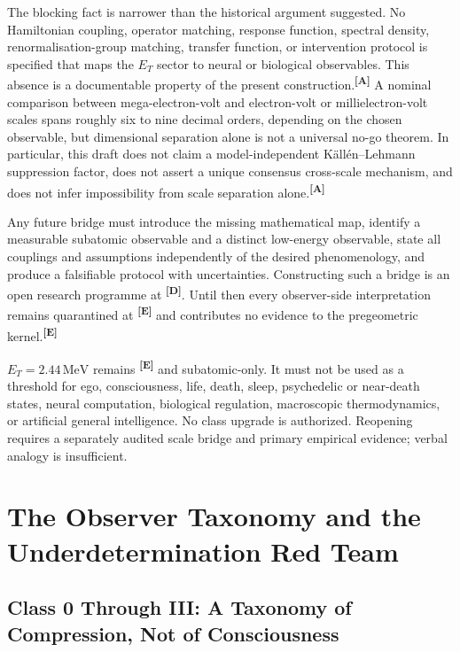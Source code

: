 \documentclass[12pt,a4paper,twoside]{article}
\theoremstyle{plain}
\theoremstyle{definition}
\theoremstyle{remark}
\newcommand{\MeV}{\,\mathrm{MeV}}
\newcommand{\catmark}[1]{\textsuperscript{\textsf{\textbf{[#1]}}}}
\newcommand{\ETorsion}{2.44\MeV} %
\begin{document}
The blocking fact is narrower than the historical argument suggested. No
Hamiltonian coupling, operator matching, response function, spectral density,
renormalisation-group matching, transfer function, or intervention protocol is
specified that maps the $E_T$ sector to neural or biological observables. This
absence is a documentable property of the present construction.\catmark{A}
A nominal comparison between mega-electron-volt and electron-volt or
millielectron-volt scales spans roughly six to nine decimal orders, depending
on the chosen observable, but dimensional separation alone is not a universal
no-go theorem. In particular, this draft does not claim a model-independent
K\"all\'en--Lehmann suppression factor, does not assert a unique consensus
cross-scale mechanism, and does not infer impossibility from scale separation
alone.\catmark{A}

Any future bridge must introduce the missing mathematical map, identify a
measurable subatomic observable and a distinct low-energy observable, state
all couplings and assumptions independently of the desired phenomenology, and
produce a falsifiable protocol with uncertainties. Constructing such a bridge
is an open research programme at \catmark{D}. Until then every observer-side
interpretation remains quarantined at \catmark{E} and contributes no evidence
to the pregeometric kernel.\catmark{E}

\begin{governancebox}
$E_T=\ETorsion$ remains \catmark{E} and subatomic-only. It must not be used as
a threshold for ego, consciousness, life, death, sleep, psychedelic or
near-death states, neural computation, biological regulation, macroscopic
thermodynamics, or artificial general intelligence. No class upgrade is
authorized. Reopening requires a separately audited scale bridge and primary
empirical evidence; verbal analogy is insufficient.
\end{governancebox}

\section{The Observer Taxonomy and the Underdetermination Red Team}
\label{sec:observer-taxonomy-underdetermination}

\subsection{Class 0 Through III: A Taxonomy of Compression, Not of Consciousness}
\label{subsec:observer-taxonomy}
\end{document}
